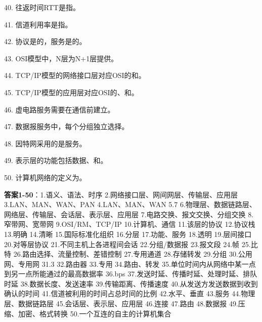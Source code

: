40. 往返时间RTT是指\underline{\hspace{4cm}}。

41. 信道利用率是指\underline{\hspace{4cm}}。

42. 协议是\underline{\hspace{2cm}}的，服务是\underline{\hspace{2cm}}的。

43. OSI模型中，N层为N+1层提供\underline{\hspace{2cm}}。

44. TCP/IP模型的网络接口层对应OSI的\underline{\hspace{2cm}}和\underline{\hspace{2cm}}。

45. TCP/IP模型的应用层对应OSI的\underline{\hspace{2cm}}、\underline{\hspace{2cm}}和\underline{\hspace{2cm}}。

46. 虚电路服务需要在通信前建立\underline{\hspace{2cm}}。

47. 数据报服务中，每个分组独立选择\underline{\hspace{2cm}}。

48. 因特网采用的是\underline{\hspace{2cm}}服务。

49. 表示层的功能包括数据\underline{\hspace{2cm}}、\underline{\hspace{2cm}}和\underline{\hspace{2cm}}。

50. 计算机网络的定义为\underline{\hspace{6cm}}。

\textbf{答案1-50}：1.语义、语法、时序 2.网络接口层、网间网层、传输层、应用层 3.LAN、MAN、WAN、PAN 4.LAN、MAN、WAN 5.7 6.物理层、数据链路层、网络层、传输层、会话层、表示层、应用层 7.电路交换、报文交换、分组交换 8.窄带网、宽带网 9.OSI/RM、TCP/IP 10.计算机、通信 11.该层的协议 12.协议栈 13.明确 14.清晰 15.国际标准化组织 16.分层 17.功能、服务 18.透明 19.层间接口 20.对等层协议 21.不同主机上各进程间会话 22.分组/数据报 23.报文段 24.帧 25.比特 26.路由选择、流量控制、差错控制 27.专用通道 28.存储转发 29.分组 30.公用网、专用网 31.3 32.路由器 33.专用 34.路由、转发 35.单位时间内从网络中某一点到另一点所能通过的最高数据率 36.bps 37.发送时延、传播时延、处理时延、排队时延 38.数据长度、发送速率 39.传输距离、传播速度 40.从发送方发送数据到收到确认的时间 41.信道被利用的时间占总时间的比例 42.水平、垂直 43.服务 44.物理层、数据链路层 45.会话层、表示层、应用层 46.连接 47.路由 48.数据报 49.压缩、加密、格式转换 50.一个互连的自主的计算机集合


